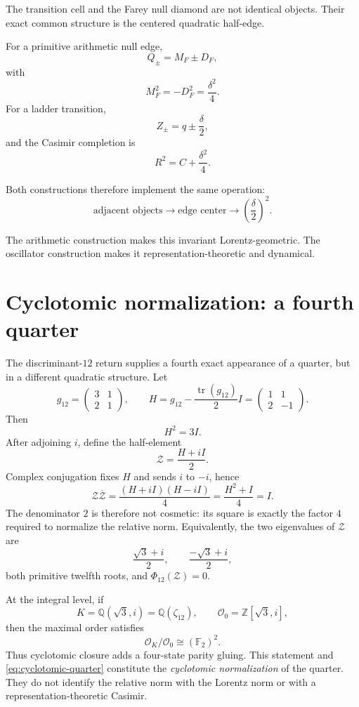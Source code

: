 \documentclass[11pt]{article}
\theoremstyle{remark}
\begin{document}
The transition cell and the Farey null diamond are not identical objects.  Their exact common structure is the centered quadratic half-edge.

For a primitive arithmetic null edge,
\[
Q_\pm=M_F\pm D_F,
\]
with
\[
M_F^2=-D_F^2=\frac{\delta^2}{4}.
\]
For a ladder transition,
\[
Z_\pm=q\pm\frac{\delta}{2},
\]
and the Casimir completion is
\[
R^2=C+\frac{\delta^2}{4}.
\]

Both constructions therefore implement the same operation:
\[
\boxed{
\text{adjacent objects}
\longrightarrow
\text{edge center}
\longrightarrow
\left(\frac{\delta}{2}\right)^2.
}
\]

The arithmetic construction makes this invariant Lorentz-geometric.  The oscillator construction makes it representation-theoretic and dynamical.

\section{Cyclotomic normalization: a fourth quarter}

The discriminant-$12$ return supplies a fourth exact appearance of a quarter,
but in a different quadratic structure.  Let
\[
g_{12}=\begin{pmatrix}3&1\\2&1\end{pmatrix},
\qquad
H=g_{12}-\frac{\operatorname{tr}(g_{12})}{2}I
=\begin{pmatrix}1&1\\2&-1\end{pmatrix}.
\]
Then
\[
H^2=3I.
\]
After adjoining $i$, define the half-element
\begin{equation}
\mathcal Z=\frac{H+iI}{2}.
\label{eq:cyclotomic-half}
\end{equation}
Complex conjugation fixes $H$ and sends $i$ to $-i$, hence
\begin{equation}
\boxed{
\mathcal Z\overline{\mathcal Z}
=\frac{(H+iI)(H-iI)}{4}
=\frac{H^2+I}{4}
=I.
}
\label{eq:cyclotomic-quarter}
\end{equation}
The denominator $2$ is therefore not cosmetic: its square is exactly the
factor $4$ required to normalize the relative norm.  Equivalently, the two
eigenvalues of $\mathcal Z$ are
\[
\frac{\sqrt3+i}{2},\qquad \frac{-\sqrt3+i}{2},
\]
both primitive twelfth roots, and $\Phi_{12}(\mathcal Z)=0$.

At the integral level, if
\[
K=\mathbb Q(\sqrt3,i)=\mathbb Q(\zeta_{12}),
\qquad
\mathcal O_0=\mathbb Z[\sqrt3,i],
\]
then the maximal order satisfies
\[
\mathcal O_K/\mathcal O_0\cong(\mathbb F_2)^2.
\]
Thus cyclotomic closure adds a four-state parity gluing.  This statement and
\eqref{eq:cyclotomic-quarter} constitute the \emph{cyclotomic
normalization} of the quarter.  They do not identify the relative norm with
the Lorentz norm or with a representation-theoretic Casimir.
\end{document}
